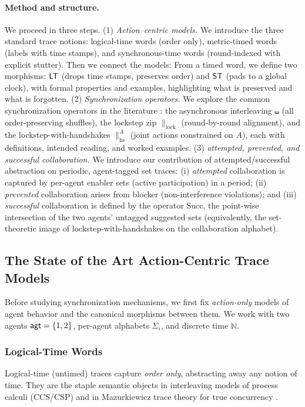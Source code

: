 \documentclass{article}
\begin{document}
  
  \paragraph{Method and structure.}
  We proceed in three steps.
  (1) \emph{Action–centric models.} We introduce the three standard trace notions:
  logical-time words (order only), metric-timed words (labels with time stamps),
  and synchronous-time words (round-indexed with explicit stutter). Then we connect the models: From a timed word, we define two morphisms:
  \(\mathsf{LT}\) (drops time stamps, preserves order) and \(\mathsf{ST}\) (pads to a global clock), with formal
  properties and examples, highlighting what is preserved and what is forgotten.
  (2) \emph{Synchronization operators.} We explore the common synchronization operators in the literature :
  the asynchronous interleaving \(\shuffle\) (all order-preserving shuffles), the lockstep zip
  \(\parallel_{\mathrm{lock}}\) (round-by-round alignment), and the lockstep-with-handshakes
  \(\parallel_{\mathrm{hs}}^{A}\) (joint actions constrained on \(A\)), each with definitions,
  intended reading, and worked examples.
  (3) \emph{attempted, prevented, and successful collaboration.} We introduce our contribution of attempted/successful
  abstraction on periodic, agent-tagged set traces: (i) \emph{attempted} collaboration is captured by
  per-agent enabler sets (active participation) in a period; (ii) \emph{prevented} collaboration arises
  from blocker (non-interference violations); and (iii) \emph{successful} collaboration is defined by
  the operator \(\mathrm{Succ}\), the point-wise intersection of the two agents’ untagged suggested sets
  (equivalently, the set-theoretic image of lockstep-with-handshakes on the collaboration alphabet).
  
  
  
  \subsection{The State of the Art Action-Centric Trace Models}
  Before studying synchronization mechanisms, we first fix \emph{action-only} models of agent behavior and the canonical morphisms between them. We work with two agents \(\mathsf{agt}=\{1,2\}\), per-agent alphabets \(\Sigma_i\), and discrete time \(\mathbb{N}\).
  
  \subsubsection{Logical-Time Words}
  Logical-time (untimed) traces capture \emph{order only}, abstracting away any notion of time.
  They are the staple semantic objects in interleaving models of process calculi (CCS/CSP) and in
  Mazurkiewicz trace theory for true concurrency \cite{Milner89,Hoare85,DiekertRozenberg95}.
  
\end{document}
